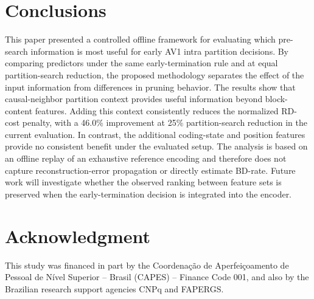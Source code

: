 \documentclass{article}
\begin{document}
\section{Conclusions}
\label{sec:conclusions}

This paper presented a controlled offline framework for evaluating which pre-search information is most useful for early AV1 intra partition decisions. By comparing predictors under the same early-termination rule and at equal partition-search reduction, the proposed methodology separates the effect of the input information from differences in pruning behavior.
The results show that causal-neighbor partition context provides useful information beyond block-content features. 
Adding this context consistently reduces the normalized RD-cost penalty, with a 46.0\% improvement at 25\% partition-search reduction in the current evaluation. In contrast, the additional coding-state and position features provide no consistent benefit under the evaluated setup.
The analysis is based on an offline replay of an exhaustive reference encoding and therefore does not capture reconstruction-error propagation or directly estimate BD-rate. Future work will investigate whether the observed ranking between feature sets is preserved when the early-termination decision is integrated into the encoder.

\section{Acknowledgment}
\label{sec:ack}

This study was financed in part by the Coor\-de\-na\c{c}\~ao de
Aper\-fei\-\c{c}oa\-men\-to de Pes\-so\-al de N\'ivel Su\-pe\-ri\-or -- Brasil
(CAPES) -- Finance Code 001, and also by the Brazilian research support agencies
CNPq and FAPERGS.



\end{document}
